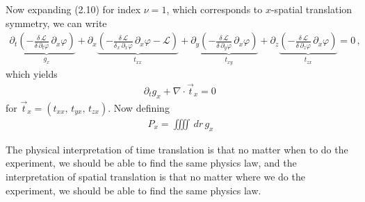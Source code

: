 \documentclass[11pt, onesided]{book}
\theoremstyle{break}
\theoremstyle{break}
\newcommand{\pd}{\partial}
\begin{document}
Now expanding (2.10) for index $\nu = 1$, which corresponds to $x$-spatial translation symmetry, we can write
\begin{align*}
\pd_t \underbrace{\left(-\frac{\delta \,\mathcal{L}}{\delta\, \pd_t \varphi}\, \pd_x \varphi\right)}_{g_x} +
\pd_x\underbrace{\left(-\frac{\delta\, \mathcal{L}}{\delta_x\, \pd_x\varphi}\, \pd_x \varphi - \mathcal{L}\right)}_{t_{xx}}  + 
\pd_y \underbrace{\left(-\frac{\delta \,\mathcal{L}}{\delta\, \pd_y \varphi}\, \pd_x \varphi\right)}_{t_{xy}} +
\pd_z \underbrace{\left(-\frac{\delta \,\mathcal{L}}{\delta\, \pd_z \varphi}\, \pd_x \varphi\right)}_{t_{zx}} =0\,,
\end{align*}
which yields
\begin{align}
\pd_t g_x + \nabla \cdot \vec{t}_x = 0\,
\end{align}
for $\vec{t}_x = (t_{xx} ,\, t_{yx},\, t_{zx})$. Now defining
\begin{align*}
P_x = \iiiint \, dr\, g_x
\end{align*}



The physical interpretation of time translation is that no matter when to do the experiment, we should be able to find the same physics law, and the interpretation of spatial translation is that no matter where we do the experiment, we should be able to find the same physics law. 





\newpage
\end{document}
